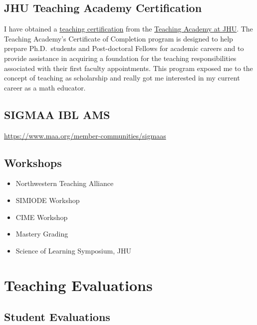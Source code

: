 \documentclass[
]{report}
\providecommand{\tightlist}{%
  \setlength{\itemsep}{0pt}\setlength{\parskip}{0pt}}
\begin{document}
\hypertarget{jhu-teaching-academy-certification}{%
\section{JHU Teaching Academy Certification}\label{jhu-teaching-academy-certification}}

I have obtained a \href{https://ctei.jhu.edu/teaching-academy/coc}{teaching certification} from the
\href{https://ctei.jhu.edu/teaching-academy}{Teaching Academy at JHU}. The Teaching Academy's Certificate
of Completion program is designed to help prepare Ph.D.~students and Post-doctoral Fellows for
academic careers and to provide assistance in acquiring a foundation for the teaching
responsibilities associated with their first faculty appointments. This program exposed me to the
concept of teaching as scholarship and really got me interested in my current career as a math
educator.

\hypertarget{sigmaa-ibl-ams}{%
\section{SIGMAA IBL AMS}\label{sigmaa-ibl-ams}}

\url{https://www.maa.org/member-communities/sigmaas}

\hypertarget{workshops}{%
\section{Workshops}\label{workshops}}

\begin{itemize}
\tightlist
\item
  Northwestern Teaching Alliance
\item
  SIMIODE Workshop
\item
  CIME Workshop
\item
  Mastery Grading
\item
  Science of Learning Symposium, JHU
\end{itemize}

\hypertarget{teaching-evaluations}{%
\chapter{Teaching Evaluations}\label{teaching-evaluations}}

\hypertarget{student-evaluations}{%
\section{Student Evaluations}\label{student-evaluations}}
\end{document}
